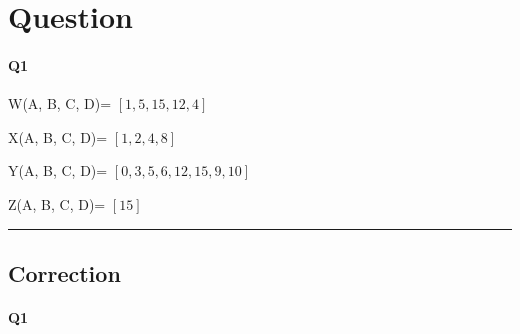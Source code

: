 
\section{Question}

\paragraph{Q1}


W(A, B, C, D)= $[1, 5, 15, 12, 4]$

X(A, B, C, D)= $[1, 2, 4, 8]$

Y(A, B, C, D)= $[0, 3, 5, 6, 12, 15, 9, 10]$

Z(A, B, C, D)= $[15]$


\hrule width 1\linewidth\pagebreak
\subsection{Correction}

\paragraph{Q1}

